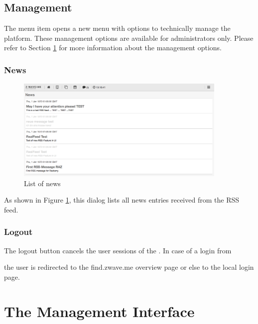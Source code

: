 \subsection{Management}

The menu item  opens a new menu with options to technically manage the platform. 
These management options are available for administrators only. Please refer to Section 
\ref{ManagementInterface} for more information about the management options.

\subsubsection{News}
\label{news}

\begin{figure}
\begin{center}
\includegraphics[width=0.9\textwidth]{pngs/cap4/news2.png}
\caption{List of \zway news}
\label{news2}
\end{center}
\end{figure}

As shown in Figure \ref{news2}, this dialog lists all news entries received from the RSS feed.

\subsubsection{Logout}

The logout button cancels the user sessions of the \zwshui. In case of 
a login from 



the user is redirected to the find.zwave.me overview page or 
else to the local login page.

\section {The Management Interface}
\label{ManagementInterface}

